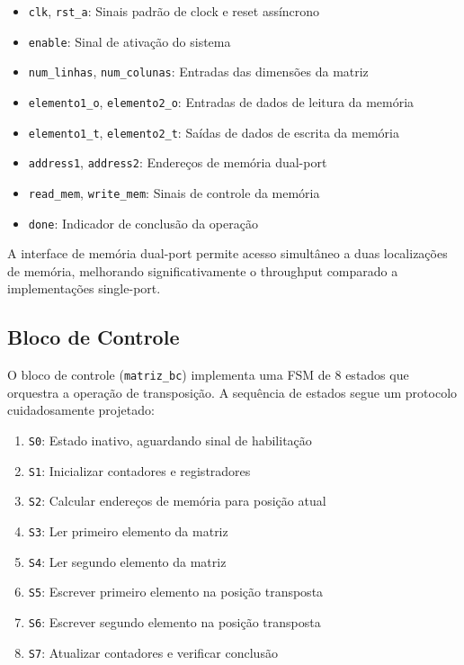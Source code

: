 \documentclass[conference]{IEEEtran}
\begin{document}
\begin{itemize}
\item \texttt{clk}, \texttt{rst\_a}: Sinais padrão de clock e reset assíncrono
\item \texttt{enable}: Sinal de ativação do sistema
\item \texttt{num\_linhas}, \texttt{num\_colunas}: Entradas das dimensões da matriz
\item \texttt{elemento1\_o}, \texttt{elemento2\_o}: Entradas de dados de leitura da memória
\item \texttt{elemento1\_t}, \texttt{elemento2\_t}: Saídas de dados de escrita da memória
\item \texttt{address1}, \texttt{address2}: Endereços de memória dual-port
\item \texttt{read\_mem}, \texttt{write\_mem}: Sinais de controle da memória
\item \texttt{done}: Indicador de conclusão da operação
\end{itemize}

A interface de memória dual-port permite acesso simultâneo a duas localizações de memória, melhorando significativamente o throughput comparado a implementações single-port.

\subsection{Bloco de Controle}

O bloco de controle (\texttt{matriz\_bc}) implementa uma FSM de 8 estados que orquestra a operação de transposição. A sequência de estados segue um protocolo cuidadosamente projetado:

\begin{enumerate}
\item \texttt{S0}: Estado inativo, aguardando sinal de habilitação
\item \texttt{S1}: Inicializar contadores e registradores
\item \texttt{S2}: Calcular endereços de memória para posição atual
\item \texttt{S3}: Ler primeiro elemento da matriz
\item \texttt{S4}: Ler segundo elemento da matriz
\item \texttt{S5}: Escrever primeiro elemento na posição transposta
\item \texttt{S6}: Escrever segundo elemento na posição transposta
\item \texttt{S7}: Atualizar contadores e verificar conclusão
\end{enumerate}
\end{document}
